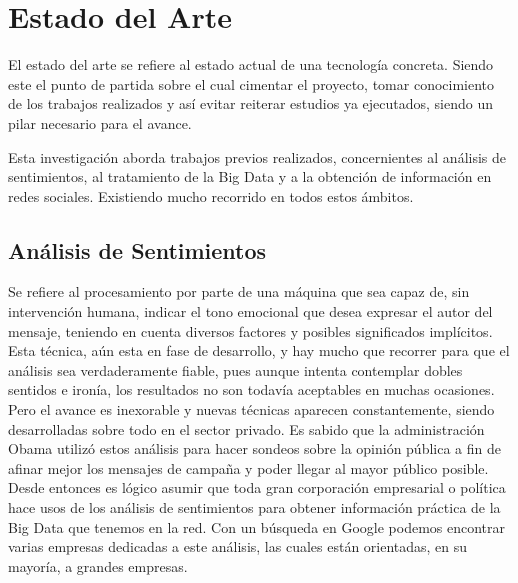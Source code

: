 
\chapter{Estado del Arte }

El estado del arte se refiere al estado actual de una tecnología concreta. Siendo este el punto de partida sobre el cual cimentar el proyecto, tomar conocimiento de los trabajos realizados y así evitar reiterar estudios ya ejecutados, siendo un pilar necesario para el avance.

Esta investigación aborda trabajos previos realizados, concernientes al análisis de sentimientos, al tratamiento de la Big Data y a la obtención de información en redes sociales. Existiendo mucho recorrido en todos estos ámbitos. 

\section{Análisis de Sentimientos}

Se refiere al procesamiento por parte de una máquina que sea capaz de, sin intervención humana, indicar el tono emocional que desea expresar el autor del mensaje, teniendo en cuenta diversos factores y posibles significados implícitos. Esta técnica, aún esta en fase de desarrollo, y hay mucho que recorrer para que el análisis sea verdaderamente fiable, pues aunque intenta contemplar dobles sentidos e ironía, los resultados no son todavía aceptables en muchas ocasiones. Pero el avance es inexorable y nuevas técnicas aparecen constantemente, siendo desarrolladas sobre todo en el sector privado. Es sabido que la administración Obama utilizó estos análisis para hacer sondeos sobre la opinión pública a fin de afinar mejor los mensajes de campaña y poder llegar al mayor público posible. Desde entonces es lógico asumir que toda gran corporación empresarial o política hace usos de los análisis de sentimientos para obtener información práctica de la Big Data que tenemos en la red. Con un búsqueda en Google podemos encontrar varias empresas dedicadas a este análisis, las cuales están orientadas, en su mayoría, a grandes empresas.  

